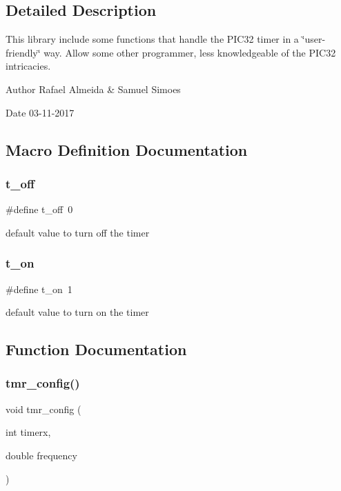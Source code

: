 \subsection{Detailed Description}
This library include some functions that handle the P\+I\+C32 timer in a \char`\"{}user-\/friendly\char`\"{} way. Allow some other programmer, less knowledgeable of the P\+I\+C32 intricacies. 

\begin{DoxyAuthor}{Author}
Rafael Almeida \& Samuel Simoes
\end{DoxyAuthor}
\begin{DoxyDate}{Date}
03-\/11-\/2017 
\end{DoxyDate}


\subsection{Macro Definition Documentation}
\mbox{\label{timer__libs_8h_ad65c41583d626847ad8f09241e0c8b34}} 
\subsubsection{t\+\_\+off}
{\footnotesize\ttfamily \#define t\+\_\+off~0}

default value to turn off the timer \mbox{\label{timer__libs_8h_a7926fbf79225fd0d715515b5756c9f3d}} 
\subsubsection{t\+\_\+on}
{\footnotesize\ttfamily \#define t\+\_\+on~1}

default value to turn on the timer 

\subsection{Function Documentation}
\mbox{\label{timer__libs_8h_ac95fce70764ad4bfdd4f0e66d23ed791}} 
\subsubsection{tmr\+\_\+config()}
{\footnotesize\ttfamily void tmr\+\_\+config (\begin{DoxyParamCaption}\item[{int}]{timerx,  }\item[{double}]{frequency }\end{DoxyParamCaption})}



